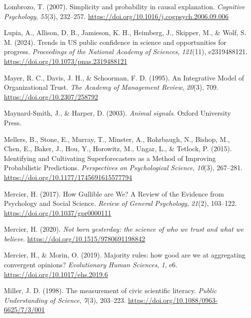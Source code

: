 \documentclass[
  jou,
  floatsintext,
  longtable,
  nolmodern,
  notxfonts,
  notimes,
  colorlinks=true,linkcolor=blue,citecolor=blue,urlcolor=blue]{apa7}
\newlength{\cslhangindent}
\newenvironment{CSLReferences}[2] %
 {\begin{list}{}{%
  \setlength{\itemindent}{0pt}
  \setlength{\leftmargin}{0pt}
  \setlength{\parsep}{0pt}
  \ifodd #1
   \setlength{\leftmargin}{\cslhangindent}
   \setlength{\itemindent}{-1\cslhangindent}
  \fi
  \setlength{\itemsep}{#2\baselineskip}}}
 {\end{list}}
\begin{document}
\begin{CSLReferences}{1}{0}
Lombrozo, T. (2007). Simplicity and probability in causal explanation.
\emph{Cognitive Psychology}, \emph{55}(3), 232--257.
\url{https://doi.org/10.1016/j.cogpsych.2006.09.006}

Lupia, A., Allison, D. B., Jamieson, K. H., Heimberg, J., Skipper, M.,
\& Wolf, S. M. (2024). Trends in US public confidence in science and
opportunities for progress. \emph{Proceedings of the National Academy of
Sciences}, \emph{121}(11), e2319488121.
\url{https://doi.org/10.1073/pnas.2319488121}

Mayer, R. C., Davis, J. H., \& Schoorman, F. D. (1995). An Integrative
Model of Organizational Trust. \emph{The Academy of Management Review},
\emph{20}(3), 709. \url{https://doi.org/10.2307/258792}

Maynard-Smith, J., \& Harper, D. (2003). \emph{Animal signals}. Oxford
University Press.

Mellers, B., Stone, E., Murray, T., Minster, A., Rohrbaugh, N., Bishop,
M., Chen, E., Baker, J., Hou, Y., Horowitz, M., Ungar, L., \& Tetlock,
P. (2015). Identifying and Cultivating Superforecasters as a Method of
Improving Probabilistic Predictions. \emph{Perspectives on Psychological
Science}, \emph{10}(3), 267--281.
\url{https://doi.org/10.1177/1745691615577794}

Mercier, H. (2017). How Gullible are We? A Review of the Evidence from
Psychology and Social Science. \emph{Review of General Psychology},
\emph{21}(2), 103--122. \url{https://doi.org/10.1037/gpr0000111}

Mercier, H. (2020). \emph{Not born yesterday: the science of who we
trust and what we believe}. \url{https://doi.org/10.1515/9780691198842}

Mercier, H., \& Morin, O. (2019). Majority rules: how good are we at
aggregating convergent opinions? \emph{Evolutionary Human Sciences},
\emph{1}, e6. \url{https://doi.org/10.1017/ehs.2019.6}

Miller, J. D. (1998). The measurement of civic scientific literacy.
\emph{Public Understanding of Science}, \emph{7}(3), 203--223.
\url{https://doi.org/10.1088/0963-6625/7/3/001}


\end{CSLReferences}
\end{document}

